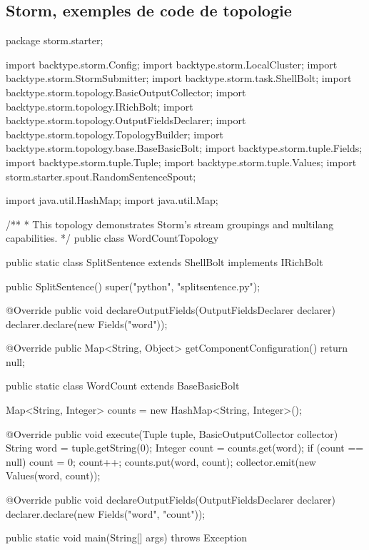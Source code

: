   \subsection{Storm, exemples de code de topologie}
  \begin{code}[Java]
    package storm.starter;

    import backtype.storm.Config;
    import backtype.storm.LocalCluster;
    import backtype.storm.StormSubmitter;
    import backtype.storm.task.ShellBolt;
    import backtype.storm.topology.BasicOutputCollector;
    import backtype.storm.topology.IRichBolt;
    import backtype.storm.topology.OutputFieldsDeclarer;
    import backtype.storm.topology.TopologyBuilder;
    import backtype.storm.topology.base.BaseBasicBolt;
    import backtype.storm.tuple.Fields;
    import backtype.storm.tuple.Tuple;
    import backtype.storm.tuple.Values;
    import storm.starter.spout.RandomSentenceSpout;

    import java.util.HashMap;
    import java.util.Map;

    /**
    * This topology demonstrates Storm's stream groupings and multilang capabilities.
    */
    public class WordCountTopology {
      public static class SplitSentence extends ShellBolt implements IRichBolt {

        public SplitSentence() {
          super("python", "splitsentence.py");
        }

        @Override
        public void declareOutputFields(OutputFieldsDeclarer declarer) {
          declarer.declare(new Fields("word"));
        }

        @Override
        public Map<String, Object> getComponentConfiguration() {
          return null;
        }
      }

      public static class WordCount extends BaseBasicBolt {
        Map<String, Integer> counts = new HashMap<String, Integer>();

        @Override
        public void execute(Tuple tuple, BasicOutputCollector collector) {
          String word = tuple.getString(0);
          Integer count = counts.get(word);
          if (count == null)
            count = 0;
          count++;
          counts.put(word, count);
          collector.emit(new Values(word, count));
        }

        @Override
        public void declareOutputFields(OutputFieldsDeclarer declarer) {
          declarer.declare(new Fields("word", "count"));
        }
      }

      public static void main(String[] args) throws Exception {

}}
\end{code}
